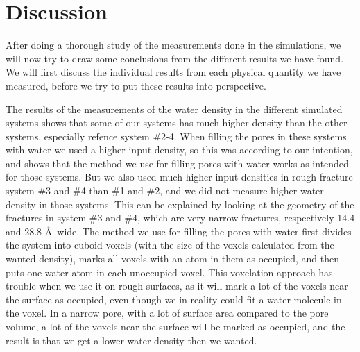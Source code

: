 \section{Discussion}
After doing a thorough study of the measurements done in the simulations, we will now try to draw some conclusions from the different results we have found. We will first discuss the individual results from each physical quantity we have measured, before we try to put these results into perspective.


The results of the measurements of the water density in the different simulated systems shows that some of our systems has much higher density than the other systems, especially refence system \#2-4. When filling the pores in these systems with water we used a higher input density, so this was according to our intention, and shows that the method we use for filling pores with water works as intended for those systems. But we also used much higher input densities in rough fracture system \#3 and \#4 than \#1 and \#2, and we did not measure higher water density in those systems. This can be explained by looking at the geometry of the fractures in system \#3 and \#4, which are very narrow fractures, respectively 14.4 and 28.8 \AA\ wide. The method we use for filling the pores with water first divides the system into cuboid voxels (with the size of the voxels calculated from the wanted density), marks all voxels with an atom in them as occupied, and then puts one water atom in each unoccupied voxel. This voxelation approach has trouble when we use it on rough surfaces, as it will mark a lot of the voxels near the surface as occupied, even though we in reality could fit a water molecule in the voxel. In a narrow pore, with a lot of surface area compared to the pore volume, a lot of the voxels near the surface will be marked as occupied, and the result is that we get a lower water density then we wanted.

